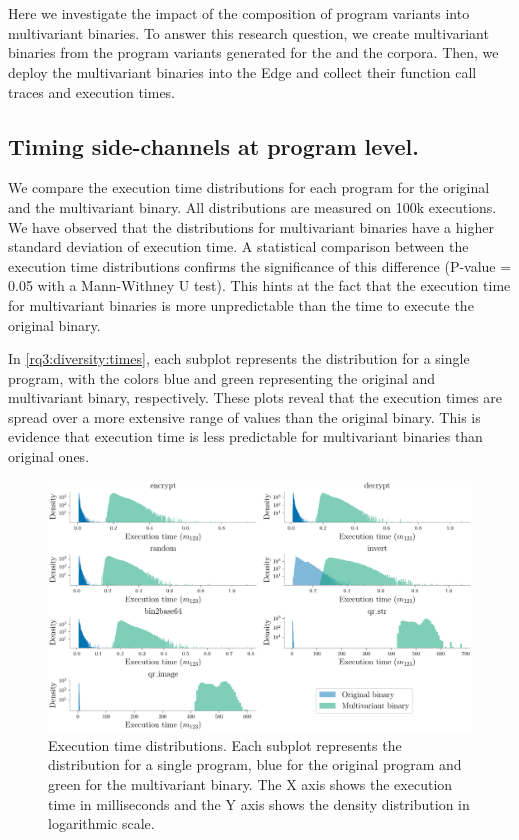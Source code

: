 \section{\rqthree}

Here we investigate the impact of the composition of program variants into multivariant binaries.
To answer this research question, we create multivariant binaries from the program variants generated for the \corpussodium and the \corpusqrcode corpora. Then, we deploy the multivariant binaries into the Edge and collect their function call traces and execution times. 

\subsection*{Timing side-channels at program level.}

We compare the execution time distributions for each program for the original and the multivariant binary. All distributions are measured on 100k executions.
We have observed that the distributions for multivariant binaries have a higher standard deviation of execution time.
A statistical comparison between the execution time distributions confirms the significance of this difference (P-value = 0.05 with a  Mann-Withney U test). This hints at the fact that the execution time for multivariant binaries is more unpredictable than the time to execute the original binary. 


In \autoref{rq3:diversity:times}, each subplot represents the distribution for a single program, with the colors blue and green representing the original and multivariant binary, respectively. These plots reveal that the execution times are spread over a more extensive range of values than the original binary. 
This is evidence that execution time is less predictable for multivariant binaries than original ones.

\begin{figure}[h]
    \includegraphics[width=\linewidth]{plots/times.pdf}
    \caption{Execution time distributions. Each subplot represents the distribution for a single program, blue for the original program and green for the multivariant binary. The X axis shows the execution time in milliseconds and the Y axis shows the density distribution in logarithmic scale.}
    \label{rq3:diversity:times}
\end{figure}

